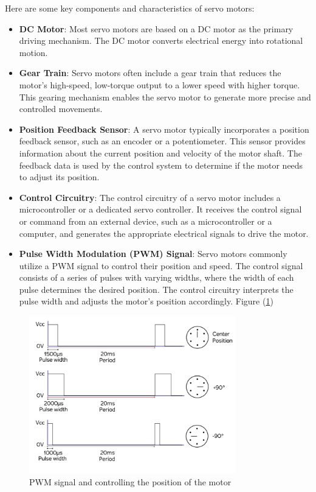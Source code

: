 \documentclass[english]{article}
\begin{document}
Here are some key components and characteristics of servo motors: 
\begin{itemize}
    \item \textbf{DC Motor}: Most servo motors are based on a DC motor
     as the primary driving mechanism. The DC motor converts electrical 
     energy into rotational motion. 
     \item \textbf{Gear Train}: Servo motors often include a gear train
      that reduces the motor's high-speed, low-torque output to a lower
       speed with higher torque. This gearing mechanism enables the servo
      motor to generate more precise and controlled movements.
    \item \textbf{Position Feedback Sensor}: A servo motor typically 
    incorporates a position feedback sensor, such as an encoder or a
     potentiometer. This sensor provides information about the current 
     position and velocity of the motor shaft. The feedback data is used
      by the control system to determine if the motor needs to adjust its 
    position.
    \item \textbf{Control Circuitry}: The control circuitry of a servo motor
     includes a microcontroller or a dedicated servo controller.
      It receives the control signal or command from an external device,
       such as a microcontroller or a computer, and generates the appropriate
        electrical signals to drive the motor. 
    \item \textbf{Pulse Width Modulation (PWM) Signal}: Servo motors commonly 
    utilize a PWM signal to control their position and speed. The control signal
     consists of a series of pulses with varying widths, where the width of each 
     pulse determines the desired position. The control circuitry interprets the
      pulse width and adjusts the motor's position accordingly. Figure (\ref{fig:PWM})
\end{itemize}
\begin{figure}[!h]
    \centering
    \includegraphics[width=0.80\textwidth, height=0.35\textheight]{figures/PWM.png}
    \caption{PWM signal and controlling the position of the motor}
    \label{fig:PWM}
\end{figure}
\end{document}
